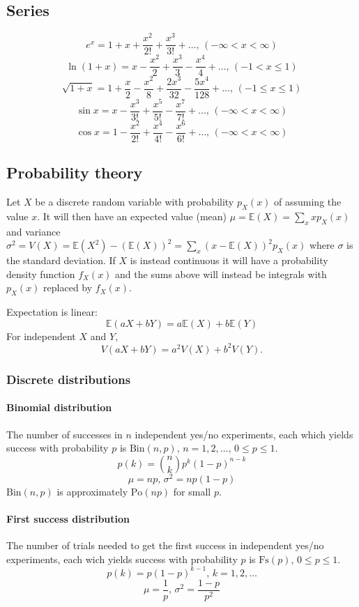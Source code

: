 \subsection{Series}
$$e^x = 1+x+\frac{x^2}{2!}+\frac{x^3}{3!}+\dots,\,(-\infty<x<\infty)$$
$$\ln(1+x) = x-\frac{x^2}{2}+\frac{x^3}{3}-\frac{x^4}{4}+\dots,\,(-1<x\leq1)$$
$$\sqrt{1+x} = 1+\frac{x}{2}-\frac{x^2}{8}+\frac{2x^3}{32}-\frac{5x^4}{128}+\dots,\,(-1\leq x\leq1)$$
$$\sin x = x-\frac{x^3}{3!}+\frac{x^5}{5!}-\frac{x^7}{7!}+\dots,\,(-\infty<x<\infty)$$
$$\cos x = 1-\frac{x^2}{2!}+\frac{x^4}{4!}-\frac{x^6}{6!}+\dots,\,(-\infty<x<\infty)$$

\subsection{Probability theory}
Let $X$ be a discrete random variable with probability $p_X(x)$ of assuming the value $x$. It will then have an expected value (mean) $\mu=\mathbb{E}(X)=\sum_xxp_X(x)$ and variance $\sigma^2=V(X)=\mathbb{E}(X^2)-(\mathbb{E}(X))^2=\sum_x(x-\mathbb{E}(X))^2p_X(x)$ where $\sigma$ is the standard deviation. If $X$ is instead continuous it will have a probability density function $f_X(x)$ and the sums above will instead be integrals with $p_X(x)$ replaced by $f_X(x)$.

Expectation is linear:
\[\mathbb{E}(aX+bY) = a\mathbb{E}(X)+b\mathbb{E}(Y)\]
For independent $X$ and $Y$, \[V(aX+bY) = a^2V(X)+b^2V(Y).\]

\subsubsection{Discrete distributions}

\paragraph{Binomial distribution}
The number of successes in $n$ independent yes/no experiments, each which yields success with probability $p$ is $\textrm{Bin}(n,p),\,n=1,2,\dots,\, 0\leq p\leq1$.
\[p(k)=\binom{n}{k}p^k(1-p)^{n-k}\]
\[\mu = np,\,\sigma^2=np(1-p)\]
$\textrm{Bin}(n,p)$ is approximately $\textrm{Po}(np)$ for small $p$.

\paragraph{First success distribution}
The number of trials needed to get the first success in independent yes/no experiments, each wich yields success with probability $p$ is $\textrm{Fs}(p),\,0\leq p\leq1$.
\[p(k)=p(1-p)^{k-1},\,k=1,2,\dots\]
\[\mu = \frac1p,\,\sigma^2=\frac{1-p}{p^2}\]

